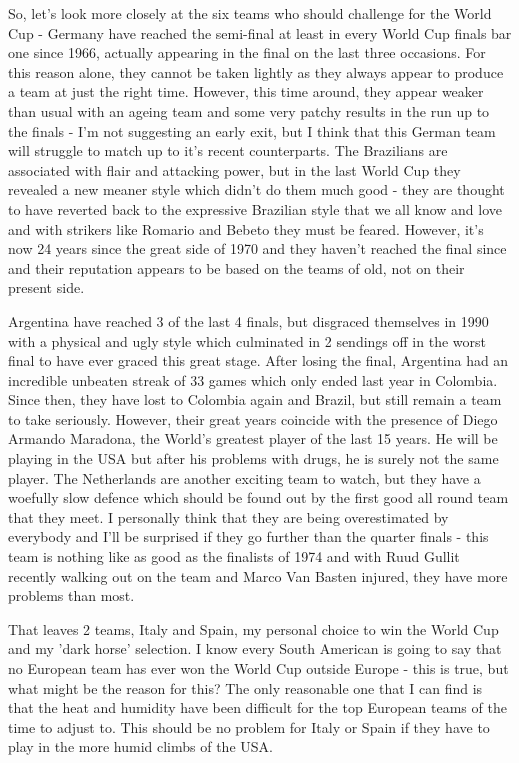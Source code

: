 So, let's look more closely at the six teams who should challenge for the World
Cup - Germany have reached the semi-final at least in every World Cup finals 
bar one since 1966, actually appearing in the final on the last three 
occasions. For this reason alone, they cannot be taken lightly as they always 
appear to produce a team at just the right time. However, this time around, 
they appear weaker than usual with an ageing team and some very patchy results 
in the run up to the finals - I'm not suggesting an early exit, but I think 
that this German team will struggle to match up to it's recent counterparts. 
The Brazilians are associated with flair and attacking power, but in the last 
World Cup they revealed a new meaner style which didn't do them much good - 
they are thought to have reverted back to the expressive Brazilian style that 
we all know and love and with strikers like Romario and Bebeto they must be 
feared. However, it's now 24 years since the great side of 1970 and they 
haven't reached the final since and their reputation appears to be based on the
teams of old, not on their present side.

Argentina have reached 3 of the last 4 finals, but disgraced themselves in 1990
with a physical and ugly style which culminated in 2 sendings off in the worst
final to have ever graced this great stage. After losing the final, Argentina 
had an incredible unbeaten streak of 33 games which only ended last year in 
Colombia. Since then, they have lost to Colombia again and Brazil, but still
remain a team to take seriously. However, their great years coincide with the
presence of Diego Armando Maradona, the World's greatest player of the last 15
years. He will be playing in the USA but after his problems with drugs, he is
surely not the same player. The Netherlands are another exciting team to watch,
but they have a woefully slow defence which should be found out by the first 
good all round team that they meet. I personally think that they are being 
overestimated by everybody and I'll be surprised if they go further than the 
quarter finals - this team is nothing like as good as the finalists of 1974 
and with Ruud Gullit recently walking out on the team and Marco Van Basten 
injured, they have more problems than most.

That leaves 2 teams, Italy and Spain, my personal choice to win the World Cup
and my 'dark horse' selection. I know every South American is going to say
that no European team has ever won the World Cup outside Europe - this is true,
but what might be the reason for this? The only reasonable one that I can find 
is that the heat and humidity have been difficult for the top European teams of
the time to adjust to. This should be no problem for Italy or Spain if they 
have to play in the more humid climbs of the USA.

